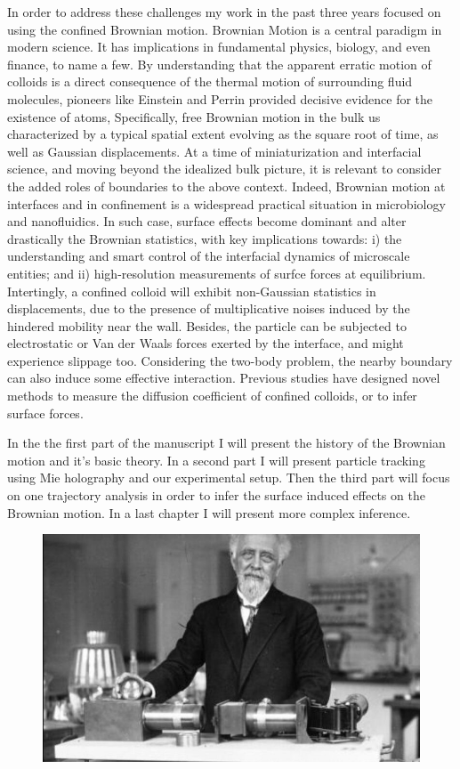 In order to address these challenges my work in the past three years focused on using the confined Brownian motion. Brownian Motion is a central paradigm in modern science. It has implications in fundamental physics, biology, and even finance, to name a few. By understanding that the apparent erratic motion of colloids is a direct consequence of the thermal motion of surrounding fluid molecules, pioneers like Einstein and Perrin provided decisive evidence for the existence of atoms, Specifically, free Brownian motion in the bulk us characterized by a typical spatial extent evolving as the square root of time, as well as Gaussian displacements. At a time of miniaturization and interfacial science, and moving beyond the idealized bulk picture, it is relevant to consider the added roles of boundaries to the above context. Indeed, Brownian motion at interfaces and in confinement is a widespread practical situation in microbiology and nanofluidics. In such case, surface effects become dominant and alter drastically the Brownian statistics, with key implications towards: i) the understanding and smart control of the interfacial dynamics of microscale entities; and ii) high-resolution measurements of surfce forces at equilibrium.
Intertingly, a confined colloid will exhibit non-Gaussian statistics in displacements, due to the presence of multiplicative noises induced by the hindered mobility near the wall. Besides, the particle can be subjected to electrostatic or Van der Waals forces exerted by the interface, and might experience slippage too. Considering the two-body problem, the nearby boundary can also induce some effective interaction. Previous studies have designed novel methods to measure the diffusion coefficient of confined colloids, or to infer surface forces.

In the the first part of the manuscript I will present the history of the Brownian motion and it's basic theory. In a second part I will present particle tracking using Mie holography and our experimental setup. Then the third part will focus on one trajectory analysis in order to infer the surface induced effects on the Brownian motion. In a last chapter I will present more complex inference.


\vspace{4cm}

\begin{figure}[h]
	\begin{center}
		\includegraphics[width=16cm]{02_body/introduction/image/perrin.jpg}
	\end{center}
\end{figure}